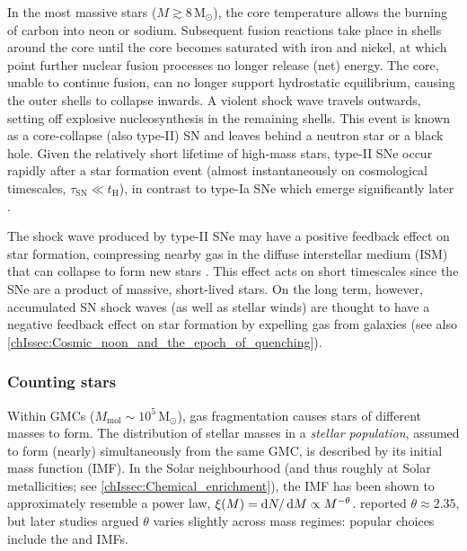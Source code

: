 In the most massive stars ($M \gtrsim 8 \, \mathrm{M_\odot}$), the core temperature allows the burning of carbon into neon or sodium. Subsequent fusion reactions take place in shells around the core until the core becomes saturated with iron and nickel, at which point further nuclear fusion processes no longer release (net) energy. The core, unable to continue fusion, can no longer support hydrostatic equilibrium, causing the outer shells to collapse inwards. A violent shock wave travels outwards, setting off explosive nucleosynthesis in the remaining shells. This event is known as a core-collapse (also type-II) SN and leaves behind a neutron star or a black hole. Given the relatively short lifetime of high-mass stars, type-II SNe occur rapidly after a star formation event (almost instantaneously on cosmological timescales, $\tau_\text{SN} \ll t_\text{H}$), in contrast to type-Ia SNe which emerge significantly later \citep{2016MNRAS.455.4183V}.

The shock wave produced by type-II SNe may have a positive feedback effect on star formation, compressing nearby gas in the diffuse interstellar medium (ISM) that can collapse to form new stars \citep[though it is unclear how effective this mechanism is;][]{2007ARA&A..45..565M}. This effect acts on short timescales since the SNe are a product of massive, short-lived stars. On the long term, however, accumulated SN shock waves (as well as stellar winds) are thought to have a negative feedback effect on star formation by expelling gas from galaxies (see also \cref{chIssec:Cosmic_noon_and_the_epoch_of_quenching}).

\subsubsection{Counting stars}
\label{chIsssec:Counting_stars}

Within GMCs ($M_\text{mol} \sim 10^{5} \, \mathrm{M_\odot}$), gas fragmentation causes stars of different masses to form. The distribution of stellar masses in a \textit{stellar population}, assumed to form (nearly) simultaneously from the same GMC, is described by its initial mass function (IMF). In the Solar neighbourhood (and thus roughly at Solar metallicities; see \cref{chIssec:Chemical_enrichment}), the IMF has been shown to approximately resemble a power law, $\xi (M) = \dif N/\dif M \propto M^{-\theta}$. \citet{1955ApJ...121..161S} reported $\theta \approx 2.35$, but later studies argued $\theta$ varies slightly across mass regimes: popular choices include the \citet{2001MNRAS.322..231K} and \citet{2003PASP..115..763C} IMFs.

